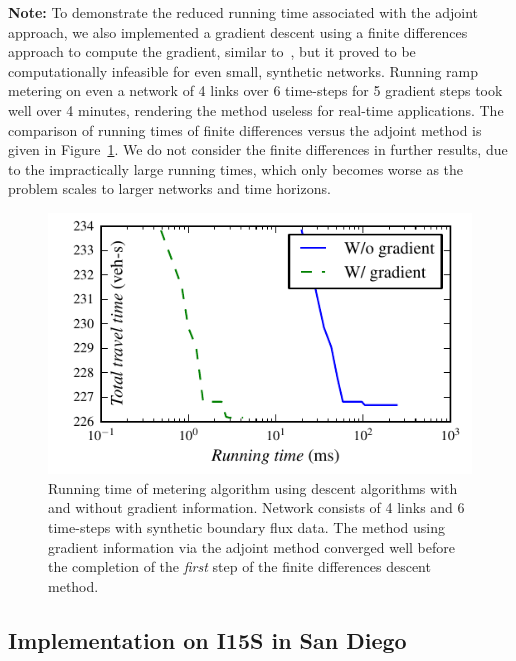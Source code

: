 \textbf{Note: } To demonstrate the reduced running time associated with the adjoint approach, we also implemented a gradient descent using a finite differences approach to compute the gradient, similar to~\cite{Frejo2011,Ramon2013}, but it proved to be computationally infeasible for even small, synthetic
networks. Running ramp metering on even a network of 4 links over
6 time-steps for 5 gradient steps took well over 4 minutes,
rendering the method useless for real-time applications. The comparison
of running times of finite differences versus the adjoint method is given in
Figure~\ref{fig:Running-time-of}. We do not consider the finite differences in further results, due to the impractically large running times, which only becomes worse as the problem scales to larger networks and time horizons.
\begin{figure}[H]
\begin{centering}
\includegraphics[width=0.5\columnwidth]{images/itergrad}
\par\end{centering}

\caption{Running time of metering algorithm using descent algorithms with and without gradient information.
Network consists of 4 links and 6 time-steps with synthetic boundary
flux data. The method using gradient information via the adjoint
method converged well before the completion of the \textit{first} step of the finite differences descent method.
\label{fig:Running-time-of}}
\end{figure}



\subsection{Implementation on I15S in San Diego\label{sub:Network}}

